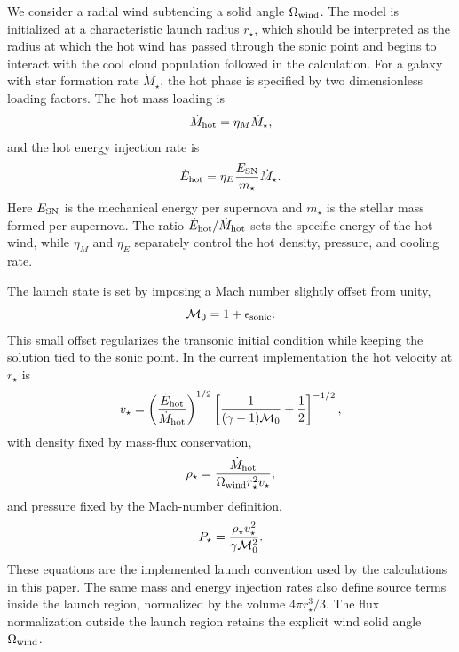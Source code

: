 We consider a radial wind subtending a solid angle $\Omega_{\rm wind}$.
The model is initialized at a characteristic launch radius $r_\star$, which should be interpreted as the radius at which the hot wind has passed through the sonic point and begins to interact with the cool cloud population followed in the calculation.
For a galaxy with star formation rate $\dot{M}_\star$, the hot phase is specified by two dimensionless loading factors.
The hot mass loading is
\begin{equation}
\dot{M}_{\rm hot} = \eta_M \dot{M}_\star ,
\end{equation}
and the hot energy injection rate is
\begin{equation}
\dot{E}_{\rm hot}
=
\eta_E
\frac{E_{\rm SN}}{m_\star}
\dot{M}_\star .
\end{equation}
Here $E_{\rm SN}$ is the mechanical energy per supernova and $m_\star$ is the stellar mass formed per supernova.
The ratio $\dot{E}_{\rm hot}/\dot{M}_{\rm hot}$ sets the specific energy of the hot wind, while $\eta_M$ and $\eta_E$ separately control the hot density, pressure, and cooling rate.

The launch state is set by imposing a Mach number slightly offset from unity,
\begin{equation}
{\cal M}_0 = 1 + \epsilon_{\rm sonic}.
\end{equation}
This small offset regularizes the transonic initial condition while keeping the solution tied to the sonic point.
In the current implementation the hot velocity at $r_\star$ is
\begin{equation}
v_\star =
\left(\frac{\dot{E}_{\rm hot}}{\dot{M}_{\rm hot}}\right)^{1/2}
\left[
\frac{1}{(\gamma-1){\cal M}_0}
+ \frac{1}{2}
\right]^{-1/2},
\end{equation}
with density fixed by mass-flux conservation,
\begin{equation}
\rho_\star =
\frac{\dot{M}_{\rm hot}}
{\Omega_{\rm wind} r_\star^2 v_\star},
\end{equation}
and pressure fixed by the Mach-number definition,
\begin{equation}
P_\star =
\frac{\rho_\star v_\star^2}{\gamma {\cal M}_0^2}.
\end{equation}
These equations are the implemented launch convention used by the calculations in this paper.
The same mass and energy injection rates also define source terms inside the launch region, normalized by the volume $4\pi r_\star^3/3$.
The flux normalization outside the launch region retains the explicit wind solid angle $\Omega_{\rm wind}$.

